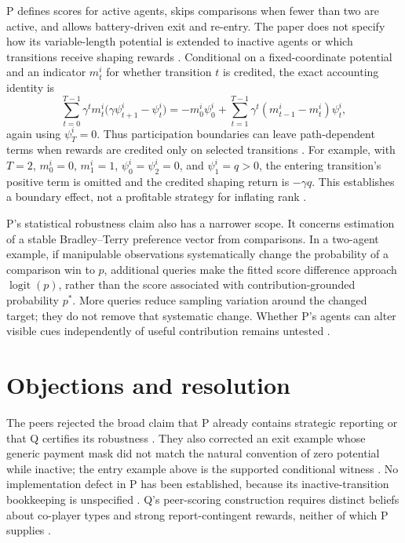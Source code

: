 \documentclass{article}
\begin{document}
P defines scores for active agents, skips comparisons when fewer than two are active, and allows battery-driven exit and re-entry. The paper does not specify how its variable-length potential is extended to inactive agents or which transitions receive shaping rewards . Conditional on a fixed-coordinate potential and an indicator \(m_t^i\) for whether transition \(t\) is credited, the exact accounting identity is
\[
\sum_{t=0}^{T-1}\gamma^t m_t^i
  \bigl(\gamma\psi_{t+1}^i-\psi_t^i\bigr)
=
-m_0^i\psi_0^i+
\sum_{t=1}^{T-1}\gamma^t
  (m_{t-1}^i-m_t^i)\psi_t^i,
\]
again using \(\psi_T^i=0\). Thus participation boundaries can leave path-dependent terms when rewards are credited only on selected transitions . For example, with \(T=2\), \(m_0^i=0\), \(m_1^i=1\), \(\psi_0^i=\psi_2^i=0\), and \(\psi_1^i=q>0\), the entering transition's positive term is omitted and the credited shaping return is \(-\gamma q\). This establishes a boundary effect, not a profitable strategy for inflating rank .

P's statistical robustness claim also has a narrower scope. It concerns estimation of a stable Bradley--Terry preference vector from comparisons. In a two-agent example, if manipulable observations systematically change the probability of a comparison win to \(p\), additional queries make the fitted score difference approach \(\operatorname{logit}(p)\), rather than the score associated with contribution-grounded probability \(p^*\). More queries reduce sampling variation around the changed target; they do not remove that systematic change. Whether P's agents can alter visible cues independently of useful contribution remains untested .

\section*{Objections and resolution}

The peers rejected the broad claim that P already contains strategic reporting or that Q certifies its robustness . They also corrected an exit example whose generic payment mask did not match the natural convention of zero potential while inactive; the entry example above is the supported conditional witness . No implementation defect in P has been established, because its inactive-transition bookkeeping is unspecified . Q's peer-scoring construction requires distinct beliefs about co-player types and strong report-contingent rewards, neither of which P supplies .
\end{document}
